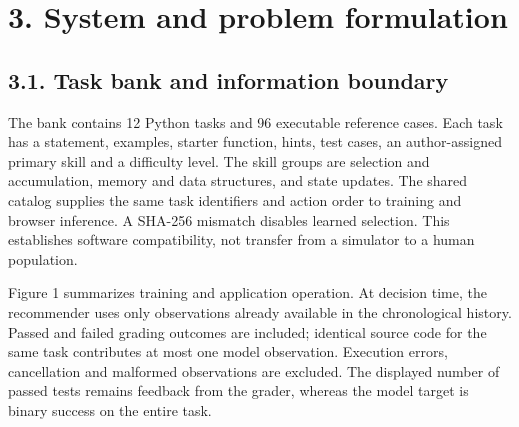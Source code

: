 \documentclass[preprint,11pt,authoryear]{elsarticle}
\begin{document}
\section*{3. System and problem formulation}

\subsection*{3.1. Task bank and information boundary}

The bank contains 12 Python tasks and 96 executable reference cases. Each task has a statement, examples, starter function, hints, test cases, an author-assigned primary skill and a difficulty level. The skill groups are selection and accumulation, memory and data structures, and state updates. The shared catalog supplies the same task identifiers and action order to training and browser inference. A SHA-256 mismatch disables learned selection. This establishes software compatibility, not transfer from a simulator to a human population.

Figure 1 summarizes training and application operation. At decision time, the recommender uses only observations already available in the chronological history. Passed and failed grading outcomes are included; identical source code for the same task contributes at most one model observation. Execution errors, cancellation and malformed observations are excluded. The displayed number of passed tests remains feedback from the grader, whereas the model target is binary success on the entire task.
\end{document}
